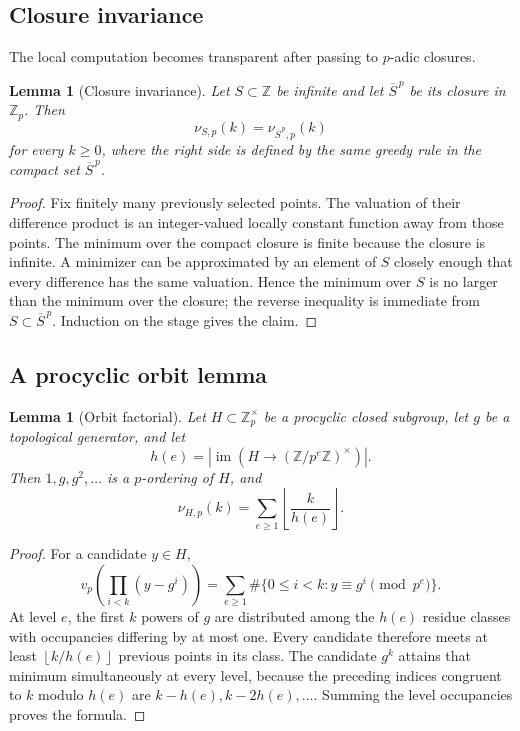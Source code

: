 \documentclass[11pt,oneside]{article}
\newtheorem{lemma}[theorem]{Lemma}
\theoremstyle{definition}
\theoremstyle{remark}
\newcommand{\Z}{\mathbb Z}
\newcommand{\floor}[1]{\left\lfloor #1\right\rfloor}
\begin{document}
\subsection{Closure invariance}

The local computation becomes transparent after passing to \(p\)-adic closures.

\begin{lemma}[Closure invariance]
\label{lem:closure-invariance}
Let \(S\subset\Z\) be infinite and let \(\overline S^{\,p}\) be its closure in \(\Z_p\).
Then
\[
  \nu_{S,p}(k)=\nu_{\overline S^{\,p},p}(k)
\]
for every \(k\ge0\), where the right side is defined by the same greedy rule in the compact
set \(\overline S^{\,p}\).
\end{lemma}

\begin{proof}
Fix finitely many previously selected points.  The valuation of their difference product is an
integer-valued locally constant function away from those points.  The minimum over the compact
closure is finite because the closure is infinite.  A minimizer can be approximated by an element
of \(S\) closely enough that every difference has the same valuation.  Hence the minimum over
\(S\) is no larger than the minimum over the closure; the reverse inequality is immediate from
\(S\subset\overline S^{\,p}\).  Induction on the stage gives the claim.
\end{proof}

\subsection{A procyclic orbit lemma}

\begin{lemma}[Orbit factorial]
\label{lem:orbit-factorial}
Let \(H\subset\Z_p^\times\) be a procyclic closed subgroup, let \(g\) be a topological
generator, and let
\[
  h(e)=|\operatorname{im}(H\to(\Z/p^e\Z)^\times)|.
\]
Then \(1,g,g^2,\ldots\) is a \(p\)-ordering of \(H\), and
\begin{equation}
  \nu_{H,p}(k)=\sum_{e\ge1}\floor{\frac{k}{h(e)}}.
  \label{eq:orbit-factorial}
\end{equation}
\end{lemma}

\begin{proof}
For a candidate \(y\in H\),
\[
 v_p\!\left(\prod_{i<k}(y-g^i)\right)
 =\sum_{e\ge1}\#\{0\le i<k:y\equiv g^i\pmod{p^e}\}.
 \label{eq:level-count}
\]
At level \(e\), the first \(k\) powers of \(g\) are distributed among the \(h(e)\) residue
classes with occupancies differing by at most one.  Every candidate therefore meets at least
\(\floor{k/h(e)}\) previous points in its class.  The candidate \(g^k\) attains that minimum
simultaneously at every level, because the preceding indices congruent to \(k\) modulo \(h(e)\)
are \(k-h(e),k-2h(e),\ldots\).  Summing the level occupancies proves the formula.
\end{proof}
\end{document}
